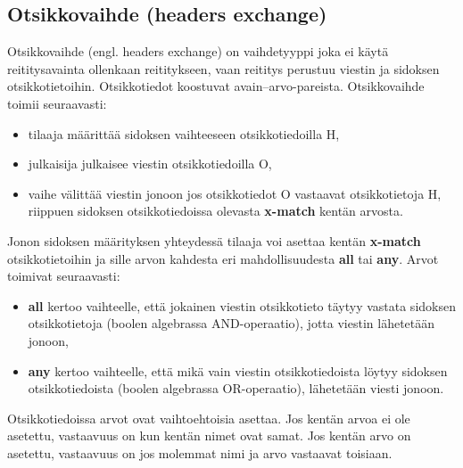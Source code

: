 \subsection{Otsikkovaihde (headers exchange)}
Otsikkovaihde (engl. headers exchange) on vaihdetyyppi joka ei käytä reititysavainta ollenkaan reititykseen, vaan reititys perustuu viestin ja sidoksen otsikkotietoihin. Otsikkotiedot koostuvat avain--arvo-pareista. Otsikkovaihde toimii seuraavasti:
\begin{itemize}
	\item tilaaja määrittää sidoksen vaihteeseen otsikkotiedoilla H,
	\item julkaisija julkaisee viestin otsikkotiedoilla O,
	\item vaihe välittää viestin jonoon jos otsikkotiedot O vastaavat otsikkotietoja H, riippuen sidoksen otsikkotiedoissa olevasta \textbf{x-match} kentän arvosta.
\end{itemize}
Jonon sidoksen määrityksen yhteydessä tilaaja voi asettaa kentän \textbf{x-match} otsikkotietoihin ja sille arvon kahdesta eri mahdollisuudesta \textbf{all} tai \textbf{any}. Arvot toimivat seuraavasti:
\begin{itemize}
	\item \textbf{all} kertoo vaihteelle, että jokainen viestin otsikkotieto täytyy vastata sidoksen otsikkotietoja (boolen algebrassa AND-operaatio), jotta viestin lähetetään jonoon,
	\item \textbf{any} kertoo vaihteelle, että mikä vain viestin otsikkotiedoista löytyy sidoksen otsikkotiedoista (boolen algebrassa OR-operaatio), lähetetään viesti jonoon. \cite[s.~28]{AMQP-specification}
\end{itemize}

Otsikkotiedoissa arvot ovat vaihtoehtoisia asettaa. Jos kentän arvoa ei ole asetettu, vastaavuus on kun kentän nimet ovat samat. Jos kentän arvo on asetettu, vastaavuus on jos molemmat nimi ja arvo vastaavat toisiaan. \cite[s.~28]{AMQP-specification}


